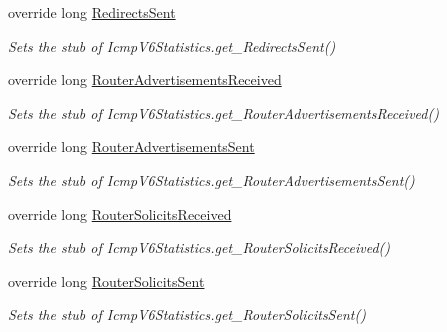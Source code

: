 \begin{DoxyCompactItemize}
override long \hyperlink{class_system_1_1_net_1_1_network_information_1_1_fakes_1_1_stub_icmp_v6_statistics_a043d076b9b210e5933f81c3a6cee4769}{Redirects\-Sent}
\begin{DoxyCompactList}\small\item\em Sets the stub of Icmp\-V6\-Statistics.\-get\-\_\-\-Redirects\-Sent()\end{DoxyCompactList}\item 
override long \hyperlink{class_system_1_1_net_1_1_network_information_1_1_fakes_1_1_stub_icmp_v6_statistics_a9a928d3e123e71d10db1581c4f4e4073}{Router\-Advertisements\-Received}
\begin{DoxyCompactList}\small\item\em Sets the stub of Icmp\-V6\-Statistics.\-get\-\_\-\-Router\-Advertisements\-Received()\end{DoxyCompactList}\item 
override long \hyperlink{class_system_1_1_net_1_1_network_information_1_1_fakes_1_1_stub_icmp_v6_statistics_a0059a92d5fbeb2bde9d9254e08e02215}{Router\-Advertisements\-Sent}
\begin{DoxyCompactList}\small\item\em Sets the stub of Icmp\-V6\-Statistics.\-get\-\_\-\-Router\-Advertisements\-Sent()\end{DoxyCompactList}\item 
override long \hyperlink{class_system_1_1_net_1_1_network_information_1_1_fakes_1_1_stub_icmp_v6_statistics_a3fc2b4b13854d6a6d89c3a9339b2aabd}{Router\-Solicits\-Received}
\begin{DoxyCompactList}\small\item\em Sets the stub of Icmp\-V6\-Statistics.\-get\-\_\-\-Router\-Solicits\-Received()\end{DoxyCompactList}\item 
override long \hyperlink{class_system_1_1_net_1_1_network_information_1_1_fakes_1_1_stub_icmp_v6_statistics_a59b54e172b8ee873cb739248d5e7350e}{Router\-Solicits\-Sent}
\begin{DoxyCompactList}\small\item\em Sets the stub of Icmp\-V6\-Statistics.\-get\-\_\-\-Router\-Solicits\-Sent()\end{DoxyCompactList}\item 

\end{DoxyCompactItemize}

